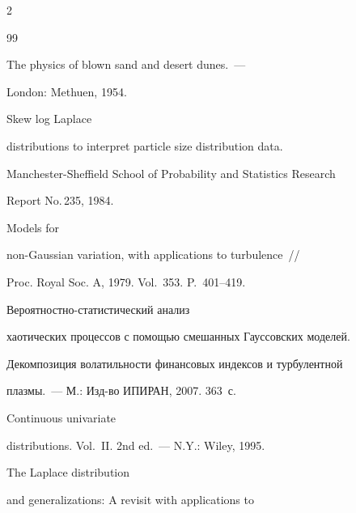 \begin{multicols}{2}
{{\begin{thebibliography}{99}




The physics of blown sand and desert dunes.~---


London: Methuen, 1954.









Skew log Laplace


distributions to interpret particle size distribution data.


Manchester-Sheffield School of Probability and Statistics Research


Report No.\,235, 1984.









Models for


non-Gaussian variation, with applications to turbulence~//


Proc. Royal Soc. A, 1979. Vol.~353. P.~401--419.









Вероятностно-статистический анализ


хаотических процессов с помощью смешанных Гауссовских моделей.


Декомпозиция волатильности финансовых индексов и турбулентной


плазмы.~--- М.: Изд-во ИПИРАН, 2007. 363~с.









Continuous univariate


distributions. Vol.~II. 2nd ed.~---  N.Y.: Wiley, 1995.









The Laplace distribution


and generalizations: A revisit with applications to



\end{thebibliography}}}
\end{multicols}
